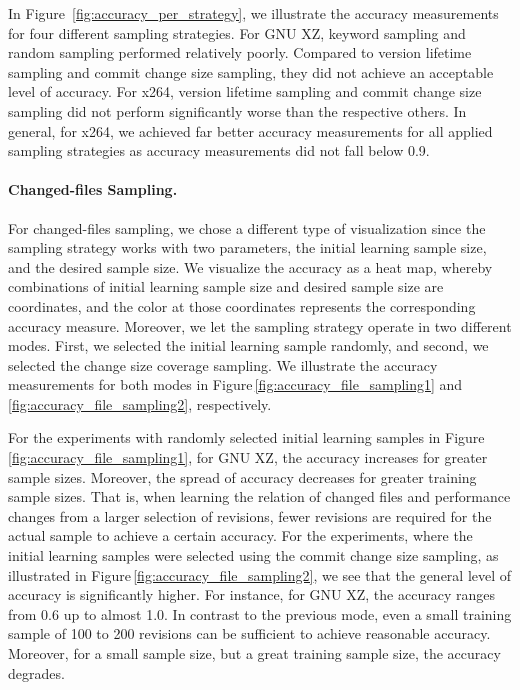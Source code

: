 In Figure~\ref{fig:accuracy_per_strategy}, we illustrate the accuracy
measurements for four different sampling strategies. For GNU XZ, keyword
sampling and random sampling performed relatively poorly. Compared to version
lifetime sampling and commit change size sampling, they did not achieve an
acceptable level of accuracy. For x264, version lifetime sampling and commit
change size sampling did not perform significantly worse than the respective
others. In general, for x264, we achieved far better accuracy measurements for
all applied sampling strategies as accuracy measurements did not fall below
0.9.

\paragraph{Changed-files Sampling.} For changed-files sampling, we chose a different type of visualization since the
sampling strategy works with two parameters, the initial learning sample size,
and the desired sample size. We visualize the accuracy as a heat map, whereby
combinations of initial learning sample size and desired sample size are
coordinates, and the color at those coordinates represents the corresponding
accuracy measure. Moreover, we let the sampling strategy operate in two
different modes. First, we selected the initial learning sample randomly, and
second, we selected the change size coverage sampling. We illustrate the
accuracy measurements for both modes in
Figure\,\ref{fig:accuracy_file_sampling1}
and\,\ref{fig:accuracy_file_sampling2}, respectively.

For the experiments with randomly selected initial learning samples in
Figure\,\ref{fig:accuracy_file_sampling1},  for GNU XZ, the accuracy increases
for greater sample sizes.
Moreover, the spread of accuracy decreases for greater training sample sizes. That is,
when learning the relation of changed files and performance changes from a
larger selection of revisions, fewer revisions are required for the actual
sample to achieve a certain accuracy. For the experiments, where the initial
learning samples were selected using the commit change size sampling, as
illustrated in Figure\,\ref{fig:accuracy_file_sampling2}, we see that the
general level of accuracy is significantly higher. For instance, for GNU XZ, the accuracy ranges from 0.6 up
to almost 1.0. In contrast to the previous mode, even a small training sample
of 100 to 200 revisions can be sufficient to achieve reasonable accuracy.
Moreover, for a small sample size, but a great training sample size, the
accuracy degrades.

